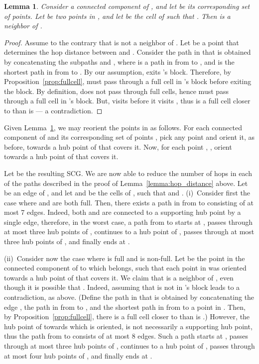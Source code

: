 \documentclass[11pt,letter]{article}
\newtheorem{corollary}[theorem]{Corollary}
\newtheorem{lemma}[theorem]{Lemma}
\newcommand{\old}[1]{{{}}}
\begin{document}
\begin{lemma}
\label{lemma:full_super_neighbor}
Consider a connected component of , and let  be its corresponding set of points.
Let  be two points in , and let  be the cell of  such that .
Then  is a neighbor of .
\end{lemma}
\begin{proof}
Assume to the contrary that  is not a neighbor of .
Let  be a point that determines the hop distance between  and .
Consider the path  in  that is obtained by concatenating the subpaths  and ,
where  is a path in  from  to ,
and  is the shortest path in  from  to .
By our assumption,  exits 's block.
Therefore, by Proposition~\ref{prop:fullcell},  must pass through a full cell in 's block before exiting the block.
By definition,  does not pass through full cells, hence  must pass through a full cell  in 's block.
But,  visits  before it visits , thus  is a full cell closer to  than is 
--- a contradiction.
\end{proof}

\old{
\begin{corollary}
\label{col:super_neighbor_full_cell}
Let  corresponds to a connected component of ,
and let  be an arbitrary point.
Then, for any , the cell of  containing  is a neighbor of .
\end{corollary}
}

Given Lemma~\ref{lemma:full_super_neighbor}, we may reorient the points in  as follows.
For each connected component of  and its corresponding set of points , pick any point  and orient it,
as before, towards a hub point of  that covers it. Now, for each point , , orient  towards a hub point
of  that covers it.

Let  be the resulting SCG.
We are now able to reduce the number of hops in each of the paths described in the proof of Lemma~\ref{lemma:hop_distance} above.
Let  be an edge of , and let  and  be the cells of , such that  and .
(i)~Consider first the case where  and  are both full.
Then, there exists a path in  from  to  consisting of at most 7 edges.
Indeed, both  and  are connected to a supporting hub point by a single edge,
therefore, in the worst case, a path from  to  starts at , passes through
at most three hub points of ,
continues to a hub point of ,
passes through at most three hub points of ,
and finally ends at .


(ii)~Consider now the case where  is full and  is non-full.
Let  be the point in the connected component of  to which  belongs, such that each point in  was oriented towards a hub point of  that covers it. We claim that  is a neighbor of , even though it is possible that .
Indeed, assuming that  is not in 's block leads to a contradiction, as above. (Define the path in  that is obtained by concatenating the edge , the path in  from  to , and the shortest path in  from  to a point in . Then, by Proposition~\ref{prop:fullcell}, there is a full cell closer to  than is .)
However, the hub point of  towards which  is oriented, is not necessarily a supporting hub point,
thus the path from  to  consists of at most 8 edges.
Such a path starts at ,
passes through at most three hub points of ,
continues to a hub point of , passes through at most four hub points of ,
and finally ends at .
\end{document}
